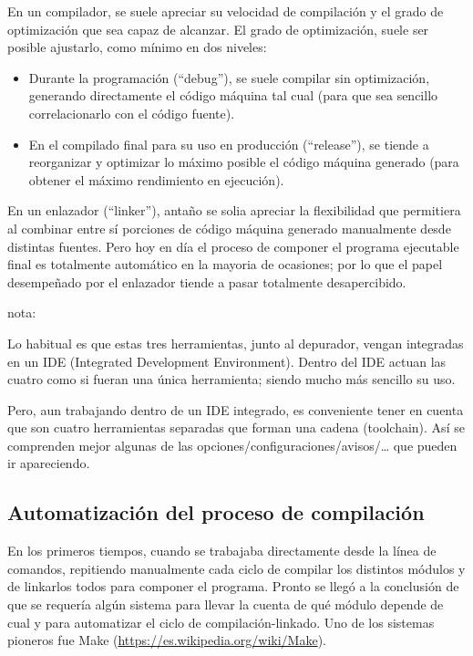 \documentclass[spanish,12pt,a4paper,final,oneside]{book}
\begin{document}
En un compilador, se suele apreciar su velocidad de compilación y el grado de optimización que sea capaz de alcanzar. El grado de optimización, suele ser posible ajustarlo, como mínimo en dos niveles:
\begin{itemize}
\item Durante la programación (``debug''), se suele compilar sin optimización, generando directamente el código máquina tal cual (para que sea sencillo correlacionarlo con el código fuente). 
\item En el compilado final para su uso en producción (``release''), se tiende a reorganizar y optimizar lo máximo posible el código máquina generado (para obtener el máximo rendimiento en ejecución).
\end{itemize}

En un enlazador (``linker''), antaño se solia apreciar la flexibilidad que permitiera al combinar entre sí porciones de código máquina generado manualmente desde distintas fuentes. Pero hoy en día el proceso de componer el programa ejecutable final es totalmente automático en la mayoria de ocasiones; por lo que el papel desempeñado por el enlazador tiende a pasar totalmente desapercibido.

\vspace{1cm}
nota:

Lo habitual es que estas tres herramientas, junto al depurador, vengan integradas en un IDE (Integrated Development Environment). Dentro del IDE actuan las cuatro como si fueran una única herramienta; siendo mucho más sencillo su uso.

Pero, aun trabajando dentro de un IDE integrado, es conveniente tener en cuenta que son cuatro herramientas separadas que forman una cadena (toolchain). Así se comprenden mejor algunas de las  opciones/configuraciones/avisos/… que pueden ir apareciendo.



\subsection{Automatización del proceso de compilación}
En los primeros tiempos, cuando se trabajaba directamente desde la línea de comandos, repitiendo manualmente cada ciclo de compilar los distintos módulos y de linkarlos todos para componer el programa. Pronto se llegó a la conclusión de que se requería algún sistema para llevar la cuenta de qué módulo depende de cual y para automatizar el ciclo de compilación-linkado. Uno de los sistemas pioneros fue Make (\url{https://es.wikipedia.org/wiki/Make}). 
\end{document}
